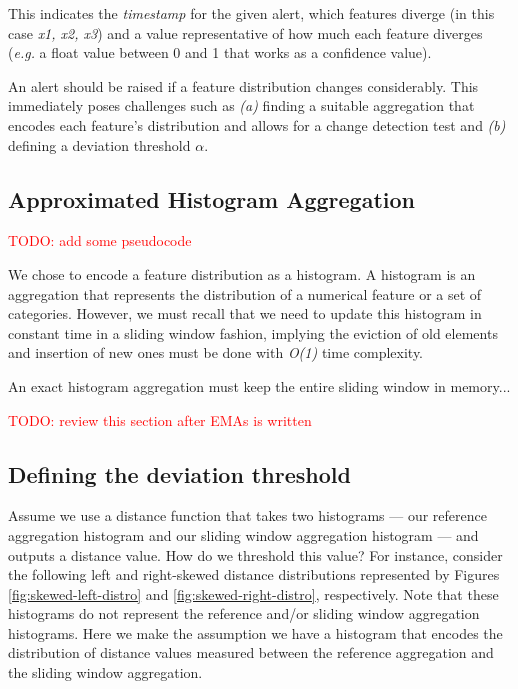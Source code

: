 This indicates the \textit{timestamp} for the given alert, which features diverge (in this case \textit{x1, x2, x3}) and a value representative of how much each feature diverges (\textit{e.g.} a float value between 0 and 1 that works as a confidence value). 

An alert should be raised if a feature distribution changes considerably. This immediately poses challenges such as \textit{(a)} finding a suitable aggregation that encodes each feature's distribution and allows for a change detection test and \textit{(b)} defining a deviation threshold $\alpha$.

\subsection*{Approximated Histogram Aggregation} \label{sec:ema-hist}
\textcolor{red}{TODO: add some pseudocode}


We chose to encode a feature distribution as a histogram. A histogram is an aggregation that represents the distribution of a numerical feature or a set of categories. However, we must recall that we need to update this histogram in constant time in a sliding window fashion, implying the eviction of old elements and insertion of new ones must be done with \textit{O(1)} time complexity.

An exact histogram aggregation must keep the entire sliding window in memory...

\textcolor{red}{TODO: review this section after EMAs is written}

\subsection*{Defining the deviation threshold}

Assume we use a distance function that takes two histograms --- our reference aggregation histogram and our sliding window aggregation histogram --- and outputs a distance value. How do we threshold this value? For instance, consider the following left and right-skewed distance distributions represented by Figures \ref{fig:skewed-left-distro} and \ref{fig:skewed-right-distro}, respectively. Note that these histograms do not represent the reference and/or sliding window aggregation histograms. Here we make the assumption we have a histogram that encodes the distribution of distance values measured between the reference aggregation and the sliding window aggregation.

